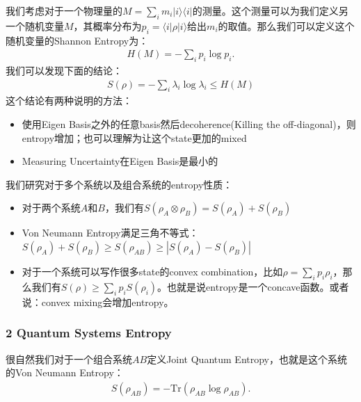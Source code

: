   \bigskip

  我们考虑对于一个物理量的$ M = \sum_i m_i |i\rangle\langle i|
  $的测量。这个测量可以为我们定义另一个随机变量$ M $，其概率分布为$ p_i = \langle i|\rho|i\rangle
  $给出$ m_i $的取值。那么我们可以定义这个随机变量的Shannon Entropy为：
  \begin{align}
    H(M) = -\sum_i p_i \log p_i.
  \end{align}
  我们可以发现下面的结论：
  \begin{align}
    S(\rho) = - \sum_i \lambda_i \log \lambda_i \leq H(M)
  \end{align}
  这个结论有两种说明的方法：
  \begin{itemize}
    \item 使用Eigen Basis之外的任意basis然后decoherence(Killing the
      off-diagonal)，则entropy增加；也可以理解为让这个state更加的mixed
    \item Measuring Uncertainty在Eigen Basis是最小的
  \end{itemize}

  \bigskip

  我们研究对于多个系统以及组合系统的entropy性质：
  \begin{itemize}
    \item 对于两个系统$ A $和$ B $，我们有$ S(\rho_A \otimes \rho_B) = S(\rho_A)
      + S(\rho_B) $
    \item Von Neumann Entropy满足三角不等式：$ S(\rho_A)+ S(\rho_B) \geq
      S(\rho_{AB}) \geq |S(\rho_A) - S(\rho_B)| $
    \item 对于一个系统可以写作很多state的convex combination，比如$ \rho = \sum_i p_i
      \rho_i $，那么我们有$ S(\rho) \geq \sum_i p_i S(\rho_i)
      $。也就是说entropy是一个concave函数。或者说：convex mixing会增加entropy。
  \end{itemize}

  \subsubsection{2 Quantum Systems Entropy}

  \bigskip

  很自然我们对于一个组合系统$ AB $定义Joint Quantum Entropy，也就是这个系统的Von Neumann Entropy：
  \begin{align}
    S(\rho_{AB}) = -\mathrm{Tr}(\rho_{AB} \log \rho_{AB}).
  \end{align}

